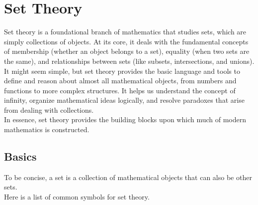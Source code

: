 \section{Set Theory}
Set theory is a foundational branch of mathematics that studies sets, which are simply collections of objects. At its core, it deals with the fundamental concepts of membership (whether an object belongs to a set), equality (when two sets are the same), and relationships between sets (like subsets, intersections, and unions).\\
It might seem simple, but set theory provides the basic language and tools to define and reason about almost all mathematical objects, from numbers and functions to more complex structures. It helps us understand the concept of infinity, organize mathematical ideas logically, and resolve paradoxes that arise from dealing with collections.\\
In essence, set theory provides the building blocks upon which much of modern mathematics is constructed.


\subsection{Basics}
To be concise, a set is a collection of mathematical objects that can also be other sets.\\
Here is a list of common symbols for set theory.

